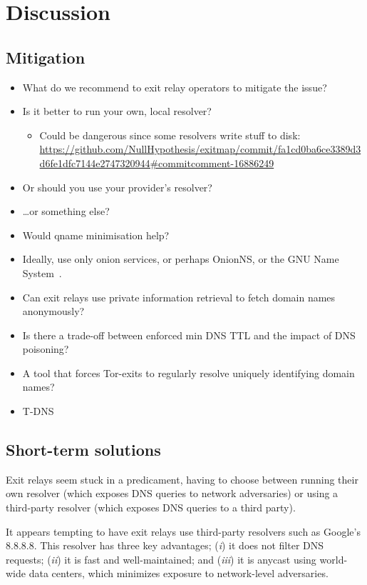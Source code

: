 \section{Discussion}
\label{sec:discussion}

\subsection{Mitigation}
\begin{itemize}
	\item What do we recommend to exit relay operators to mitigate the issue?
	\item Is it better to run your own, local resolver?
		\begin{itemize}
			\item Could be dangerous since some resolvers write stuff to disk:
		\url{https://github.com/NullHypothesis/exitmap/commit/fa1cd0ba6ce3389d3d6fe1dfc7144e2747320944#commitcomment-16886249}
		\end{itemize}
	\item Or should you use your provider's resolver?
	\item \ldots or something else?
	\item Would qname minimisation help?
	\item Ideally, use only onion services, or perhaps OnionNS, or the GNU Name
		System~\cite{Wachs2014a}.
	\item Can exit relays use private information retrieval to fetch domain
		names anonymously?
	\item Is there a trade-off between enforced min DNS TTL and the impact of
		DNS poisoning?
	\item A tool that forces Tor-exits to regularly resolve uniquely identifying
		domain names?
	\item T-DNS~\cite{Zhu2015a}
\end{itemize}

\subsection{Short-term solutions}
Exit relays seem stuck in a predicament, having to choose between running their
own resolver (which exposes DNS queries to network adversaries) or using a
third-party resolver (which exposes DNS queries to a third party).

It appears tempting to have exit relays use third-party resolvers such as
Google's 8.8.8.8.  This resolver has three key advantages; (\emph{i}) it does
not filter DNS requests; (\emph{ii}) it is fast and well-maintained; and
(\emph{iii}) it is anycast using world-wide data centers, which minimizes
exposure to network-level adversaries.

